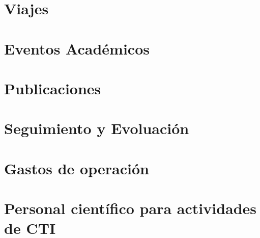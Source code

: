 \documentclass{report}
\begin{document}
\section*{Viajes}

\section*{Eventos Acad\'emicos}

\section*{Publicaciones}


\section*{Seguimiento y Evoluaci\'on}

\section{Gastos de operaci\'on} 


\section*{Personal cient\'ifico para actividades de CTI}

\end{document}
